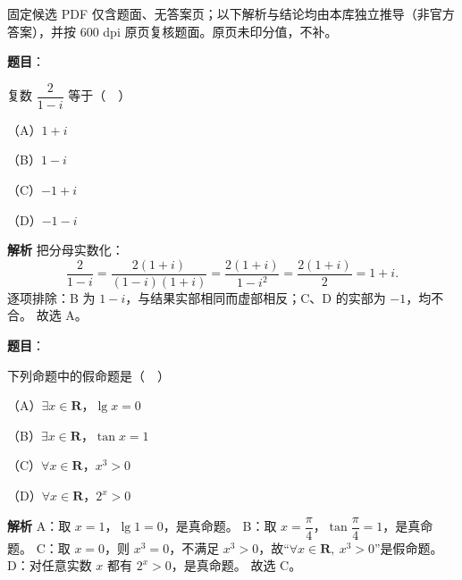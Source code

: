 \begin{gktip}
固定候选 PDF 仅含题面、无答案页；以下解析与结论均由本库独立推导（非官方答案），并按 600 dpi 原页复核题面。原页未印分值，不补。
\end{gktip}

\begin{answer}

\textbf{题目}：

复数 $\dfrac{2}{1-i}$ 等于（　）

（A）$1+i$

（B）$1-i$

（C）$-1+i$

（D）$-1-i$

\textbf{解析}
把分母实数化：
\nopagebreak[4]
\[\frac{2}{1-i}=\frac{2(1+i)}{(1-i)(1+i)}=\frac{2(1+i)}{1-i^2}=\frac{2(1+i)}{2}=1+i.\]
逐项排除：B 为 $1-i$，与结果实部相同而虚部相反；C、D 的实部为 $-1$，均不合。
故选 A。


\end{answer}
\begin{answer}

\textbf{题目}：

下列命题中的假命题是（　）

（A）$\exists x\in\mathbf R$，$\lg x=0$

（B）$\exists x\in\mathbf R$，$\tan x=1$

（C）$\forall x\in\mathbf R$，$x^3>0$

（D）$\forall x\in\mathbf R$，$2^x>0$

\textbf{解析}
A：取 $x=1$，$\lg 1=0$，是真命题。
B：取 $x=\dfrac\pi4$，$\tan\dfrac\pi4=1$，是真命题。
C：取 $x=0$，则 $x^3=0$，不满足 $x^3>0$，故“$\forall x\in\mathbf R,\ x^3>0$”是假命题。
D：对任意实数 $x$ 都有 $2^x>0$，是真命题。
故选 C。


\end{answer}
